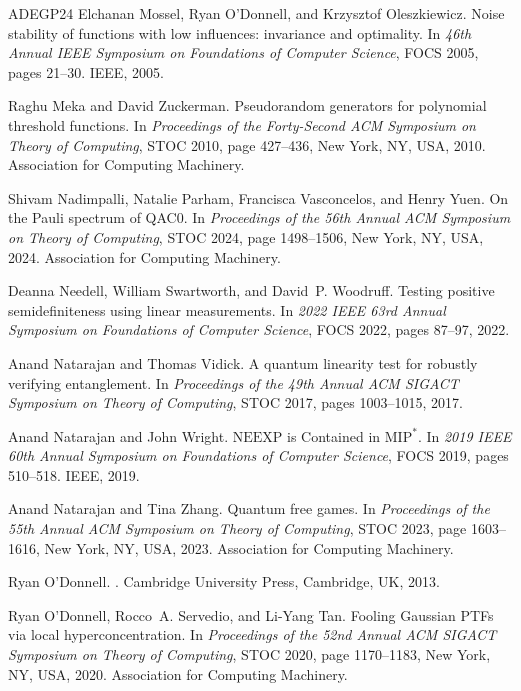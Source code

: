 \documentclass[10pt,a4paper]{article}
\theoremstyle{plain}
\theoremstyle{definition}
\newcommand{\1}{\mathbb{1}} %
\begin{document}
\begin{thebibliography}{ADEGP24}
Elchanan Mossel, Ryan O'Donnell, and Krzysztof Oleszkiewicz.
\newblock Noise stability of functions with low influences: invariance and
  optimality.
\newblock In {\em 46th Annual IEEE Symposium on Foundations of Computer
  Science}, FOCS 2005, pages 21--30. IEEE, 2005.

Raghu Meka and David Zuckerman.
\newblock Pseudorandom generators for polynomial threshold functions.
\newblock In {\em Proceedings of the Forty-Second ACM Symposium on Theory of
  Computing}, STOC 2010, page 427–436, New York, NY, USA, 2010. Association
  for Computing Machinery.

Shivam Nadimpalli, Natalie Parham, Francisca Vasconcelos, and Henry Yuen.
\newblock On the {P}auli spectrum of {QAC}0.
\newblock In {\em Proceedings of the 56th Annual ACM Symposium on Theory of
  Computing}, STOC 2024, page 1498–1506, New York, NY, USA, 2024. Association
  for Computing Machinery.

Deanna Needell, William Swartworth, and David~P. Woodruff.
\newblock Testing positive semidefiniteness using linear measurements.
\newblock In {\em 2022 IEEE 63rd Annual Symposium on Foundations of Computer
  Science}, FOCS 2022, pages 87--97, 2022.

Anand Natarajan and Thomas Vidick.
\newblock A quantum linearity test for robustly verifying entanglement.
\newblock In {\em Proceedings of the 49th Annual ACM SIGACT Symposium on Theory
  of Computing}, STOC 2017, pages 1003--1015, 2017.

Anand Natarajan and John Wright.
\newblock $\mathrm{NEEXP}$ is {C}ontained in $\mathrm{MIP}^*$.
\newblock In {\em 2019 IEEE 60th Annual Symposium on Foundations of Computer
  Science}, FOCS 2019, pages 510--518. IEEE, 2019.

Anand Natarajan and Tina Zhang.
\newblock Quantum free games.
\newblock In {\em Proceedings of the 55th Annual ACM Symposium on Theory of
  Computing}, STOC 2023, page 1603–1616, New York, NY, USA, 2023. Association
  for Computing Machinery.

Ryan O'Donnell.
.
\newblock Cambridge University Press, Cambridge, UK, 2013.

Ryan O'Donnell, Rocco~A. Servedio, and Li-Yang Tan.
\newblock Fooling {G}aussian {PTF}s via local hyperconcentration.
\newblock In {\em Proceedings of the 52nd Annual ACM SIGACT Symposium on Theory
  of Computing}, STOC 2020, page 1170–1183, New York, NY, USA, 2020.
  Association for Computing Machinery.


\end{thebibliography}
\end{document}
